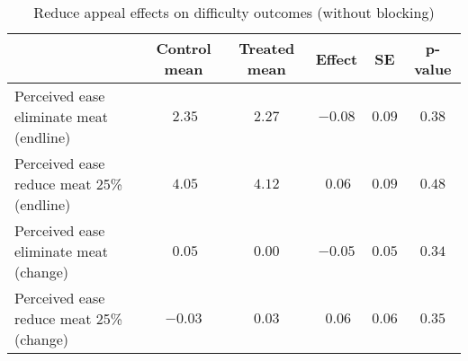 \begin{table*}[ht]
\caption{Reduce appeal effects on difficulty outcomes (without blocking)\label{round}} 
\begin{center}
\begin{tabular}{lccccc}
\hline\hline
\multicolumn{1}{l}{}&\multicolumn{1}{c}{Control mean}&\multicolumn{1}{c}{Treated mean}&\multicolumn{1}{c}{Effect}&\multicolumn{1}{c}{SE}&\multicolumn{1}{c}{p-value}\tabularnewline
\hline
Perceived ease eliminate meat (endline)&$~2.35$&$2.27$&$-0.08$&$0.09$&$0.38$\tabularnewline
Perceived ease reduce meat 25\% (endline)&$~4.05$&$4.12$&$~0.06$&$0.09$&$0.48$\tabularnewline
Perceived ease eliminate meat (change)&$~0.05$&$0.00$&$-0.05$&$0.05$&$0.34$\tabularnewline
Perceived ease reduce meat 25\% (change)&$-0.03$&$0.03$&$~0.06$&$0.06$&$0.35$\tabularnewline
\hline
\end{tabular}\end{center}

\end{table*}
